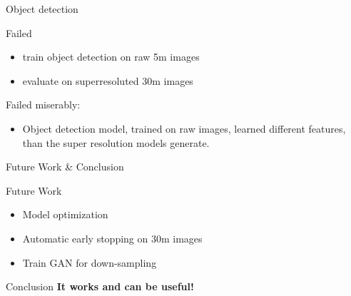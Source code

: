 \documentclass[aspectratio=43]{beamer}
\begin{document}


\begin{frame}{Object detection}
	\begin{exampleblock}{Failed}
	\begin{itemize}
		\item train object detection on raw 5m images
		\item evaluate on superresoluted 30m images
		
	\end{itemize}
	Failed miserably:
	\begin{itemize}
		\item Object detection model, trained on raw images, learned different features, 
		than the super resolution models generate.		
	\end{itemize}
		
	\end{exampleblock}			

\end{frame}



\begin{frame}{Future Work \& Conclusion}
	\begin{block}{Future Work}
	\begin{itemize}
		\item Model optimization
		\item Automatic early stopping on 30m images
		\item Train GAN for down-sampling
	\end{itemize}			
	\end{block}
	\begin{block}{Conclusion}
		\textbf{It works and can be useful!}
	
	\end{block}	
	
\end{frame}
\end{document}
